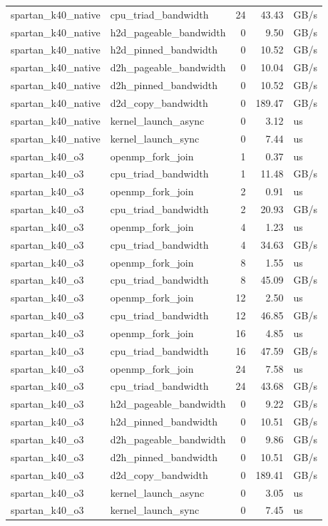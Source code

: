 \begin{tabular}{llrrl}
spartan\_k40\_native & cpu\_triad\_bandwidth & 24 & 43.43 & GB/s \\
spartan\_k40\_native & h2d\_pageable\_bandwidth & 0 & 9.50 & GB/s \\
spartan\_k40\_native & h2d\_pinned\_bandwidth & 0 & 10.52 & GB/s \\
spartan\_k40\_native & d2h\_pageable\_bandwidth & 0 & 10.04 & GB/s \\
spartan\_k40\_native & d2h\_pinned\_bandwidth & 0 & 10.52 & GB/s \\
spartan\_k40\_native & d2d\_copy\_bandwidth & 0 & 189.47 & GB/s \\
spartan\_k40\_native & kernel\_launch\_async & 0 & 3.12 & us \\
spartan\_k40\_native & kernel\_launch\_sync & 0 & 7.44 & us \\
spartan\_k40\_o3 & openmp\_fork\_join & 1 & 0.37 & us \\
spartan\_k40\_o3 & cpu\_triad\_bandwidth & 1 & 11.48 & GB/s \\
spartan\_k40\_o3 & openmp\_fork\_join & 2 & 0.91 & us \\
spartan\_k40\_o3 & cpu\_triad\_bandwidth & 2 & 20.93 & GB/s \\
spartan\_k40\_o3 & openmp\_fork\_join & 4 & 1.23 & us \\
spartan\_k40\_o3 & cpu\_triad\_bandwidth & 4 & 34.63 & GB/s \\
spartan\_k40\_o3 & openmp\_fork\_join & 8 & 1.55 & us \\
spartan\_k40\_o3 & cpu\_triad\_bandwidth & 8 & 45.09 & GB/s \\
spartan\_k40\_o3 & openmp\_fork\_join & 12 & 2.50 & us \\
spartan\_k40\_o3 & cpu\_triad\_bandwidth & 12 & 46.85 & GB/s \\
spartan\_k40\_o3 & openmp\_fork\_join & 16 & 4.85 & us \\
spartan\_k40\_o3 & cpu\_triad\_bandwidth & 16 & 47.59 & GB/s \\
spartan\_k40\_o3 & openmp\_fork\_join & 24 & 7.58 & us \\
spartan\_k40\_o3 & cpu\_triad\_bandwidth & 24 & 43.68 & GB/s \\
spartan\_k40\_o3 & h2d\_pageable\_bandwidth & 0 & 9.22 & GB/s \\
spartan\_k40\_o3 & h2d\_pinned\_bandwidth & 0 & 10.51 & GB/s \\
spartan\_k40\_o3 & d2h\_pageable\_bandwidth & 0 & 9.86 & GB/s \\
spartan\_k40\_o3 & d2h\_pinned\_bandwidth & 0 & 10.51 & GB/s \\
spartan\_k40\_o3 & d2d\_copy\_bandwidth & 0 & 189.41 & GB/s \\
spartan\_k40\_o3 & kernel\_launch\_async & 0 & 3.05 & us \\
spartan\_k40\_o3 & kernel\_launch\_sync & 0 & 7.45 & us \\
\bottomrule
\end{tabular}
